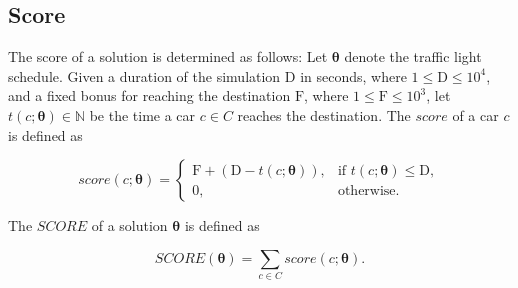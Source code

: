 \newpage

\subsection{Score}

The score of a solution is determined as follows: Let $\bm{\theta}$ denote the traffic light schedule. Given a duration of the simulation $\mathrm{D}$ in seconds, where $1 \leq \mathrm{D} \leq 10^4$, and a fixed bonus for reaching the destination $\mathrm{F}$, where $1 \leq \mathrm{F} \leq 10^3$, let $t(c; \bm{\theta}) \in \mathbb{N}$ be the time a car $c \in C$ reaches the destination. The $score$ of a car $c$ is defined as

\begin{equation}
    score(c; \bm{\theta}) =
    \begin{cases}
        \mathrm{F} + (\mathrm{D} - t(c; \bm{\theta})), & \text{if $t(c; \bm{\theta}) \leq \mathrm{D}$}, \\
        0, & \text{otherwise}.
    \end{cases}
\end{equation}

The $SCORE$ of a solution $\bm{\theta}$ is defined as

\begin{equation}
    SCORE(\bm{\theta}) = \sum_{c \in C} score(c; \bm{\theta}).
\end{equation}
